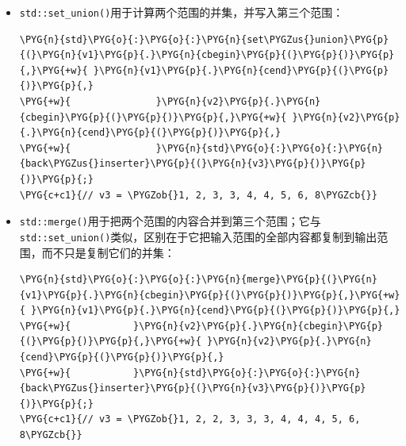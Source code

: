 \begin{itemize}
\item \texttt{std::\allowbreak{}set\_\allowbreak{}union()}用于计算两个范围的并集，并写入第三个范围：



\begin{codeblockbg}
\begin{Verbatim}[commandchars=\\\{\},breaklines=true,breakanywhere=true,fontsize=\codefont,xleftmargin=17bp]
\PYG{n}{std}\PYG{o}{:}\PYG{o}{:}\PYG{n}{set\PYGZus{}union}\PYG{p}{(}\PYG{n}{v1}\PYG{p}{.}\PYG{n}{cbegin}\PYG{p}{(}\PYG{p}{)}\PYG{p}{,}\PYG{+w}{ }\PYG{n}{v1}\PYG{p}{.}\PYG{n}{cend}\PYG{p}{(}\PYG{p}{)}\PYG{p}{,}
\PYG{+w}{               }\PYG{n}{v2}\PYG{p}{.}\PYG{n}{cbegin}\PYG{p}{(}\PYG{p}{)}\PYG{p}{,}\PYG{+w}{ }\PYG{n}{v2}\PYG{p}{.}\PYG{n}{cend}\PYG{p}{(}\PYG{p}{)}\PYG{p}{,}
\PYG{+w}{               }\PYG{n}{std}\PYG{o}{:}\PYG{o}{:}\PYG{n}{back\PYGZus{}inserter}\PYG{p}{(}\PYG{n}{v3}\PYG{p}{)}\PYG{p}{)}\PYG{p}{;}
\PYG{c+c1}{// v3 = \PYGZob{}1, 2, 3, 3, 4, 4, 5, 6, 8\PYGZcb{}}
\end{Verbatim}
\end{codeblockbg}



\item \texttt{std::\allowbreak{}merge()}用于把两个范围的内容合并到第三个范围；它与\texttt{std::\allowbreak{}set\_\allowbreak{}union()}类似，区别在于它把输入范围的全部内容都复制到输出范围，而不只是复制它们的并集：



\begin{codeblockbg}
\begin{Verbatim}[commandchars=\\\{\},breaklines=true,breakanywhere=true,fontsize=\codefont,xleftmargin=17bp]
\PYG{n}{std}\PYG{o}{:}\PYG{o}{:}\PYG{n}{merge}\PYG{p}{(}\PYG{n}{v1}\PYG{p}{.}\PYG{n}{cbegin}\PYG{p}{(}\PYG{p}{)}\PYG{p}{,}\PYG{+w}{ }\PYG{n}{v1}\PYG{p}{.}\PYG{n}{cend}\PYG{p}{(}\PYG{p}{)}\PYG{p}{,}
\PYG{+w}{           }\PYG{n}{v2}\PYG{p}{.}\PYG{n}{cbegin}\PYG{p}{(}\PYG{p}{)}\PYG{p}{,}\PYG{+w}{ }\PYG{n}{v2}\PYG{p}{.}\PYG{n}{cend}\PYG{p}{(}\PYG{p}{)}\PYG{p}{,}
\PYG{+w}{           }\PYG{n}{std}\PYG{o}{:}\PYG{o}{:}\PYG{n}{back\PYGZus{}inserter}\PYG{p}{(}\PYG{n}{v3}\PYG{p}{)}\PYG{p}{)}\PYG{p}{;}
\PYG{c+c1}{// v3 = \PYGZob{}1, 2, 2, 3, 3, 3, 4, 4, 4, 5, 6, 8\PYGZcb{}}
\end{Verbatim}
\end{codeblockbg}



\end{itemize}
